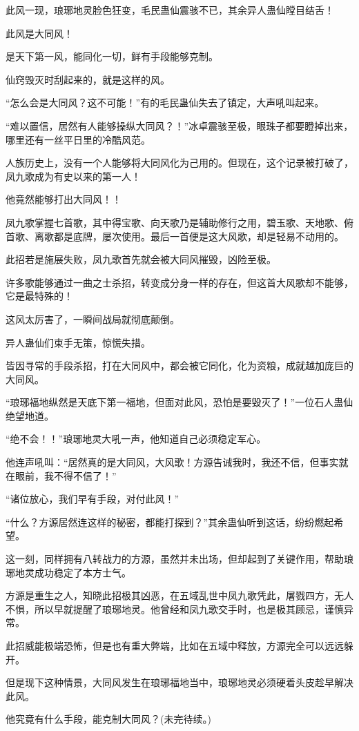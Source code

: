 \begin{this_body}
此风一现，琅琊地灵脸色狂变，毛民蛊仙震骇不已，其余异人蛊仙瞠目结舌！

此风是大同风！

是天下第一风，能同化一切，鲜有手段能够克制。

仙窍毁灭时刮起来的，就是这样的风。

“怎么会是大同风？这不可能！”有的毛民蛊仙失去了镇定，大声吼叫起来。

“难以置信，居然有人能够操纵大同风？！”冰卓震骇至极，眼珠子都要瞪掉出来，哪里还有一丝平日里的冷酷风范。

人族历史上，没有一个人能够将大同风化为己用的。但现在，这个记录被打破了，凤九歌成为有史以来的第一人！

他竟然能够打出大同风！！

凤九歌掌握七首歌，其中得宝歌、向天歌乃是辅助修行之用，碧玉歌、天地歌、俯首歌、离歌都是底牌，屡次使用。最后一首便是这大风歌，却是轻易不动用的。

此招若是施展失败，凤九歌首先就会被大同风摧毁，凶险至极。

许多歌能够通过一曲之士杀招，转变成分身一样的存在，但这首大风歌却不能够，它是最特殊的！

这风太厉害了，一瞬间战局就彻底颠倒。

异人蛊仙们束手无策，惊慌失措。

皆因寻常的手段杀招，打在大同风中，都会被它同化，化为资粮，成就越加庞巨的大同风。

“琅琊福地纵然是天底下第一福地，但面对此风，恐怕是要毁灭了！”一位石人蛊仙绝望地道。

“绝不会！！”琅琊地灵大吼一声，他知道自己必须稳定军心。

他连声吼叫：“居然真的是大同风，大风歌！方源告诫我时，我还不信，但事实就在眼前，我不得不信了！”

“诸位放心，我们早有手段，对付此风！”

“什么？方源居然连这样的秘密，都能打探到？”其余蛊仙听到这话，纷纷燃起希望。

这一刻，同样拥有八转战力的方源，虽然并未出场，但却起到了关键作用，帮助琅琊地灵成功稳定了本方士气。

方源是重生之人，知晓此招极其凶恶，在五域乱世中凤九歌凭此，屠戮四方，无人不惧，所以早就提醒了琅琊地灵。他曾经和凤九歌交手时，也是极其顾忌，谨慎异常。

此招威能极端恐怖，但是也有重大弊端，比如在五域中释放，方源完全可以远远躲开。

但是现下这种情景，大同风发生在琅琊福地当中，琅琊地灵必须硬着头皮趁早解决此风。

他究竟有什么手段，能克制大同风？(未完待续。)

\end{this_body}

